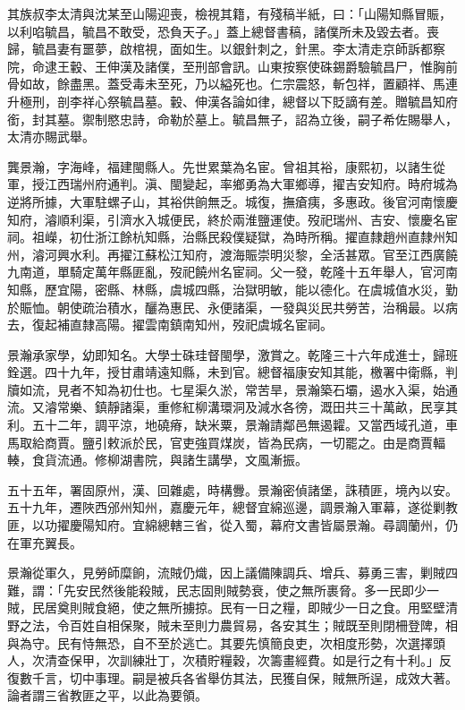 \begin{pinyinscope}
其族叔李太清與沈某至山陽迎喪，檢視其籍，有殘稿半紙，曰：「山陽知縣冒賑，以利啗毓昌，毓昌不敢受，恐負天子。」蓋上總督書稿，諸僕所未及毀去者。喪歸，毓昌妻有噩夢，啟棺視，面如生。以銀針刺之，針黑。李太清走京師訴都察院，命逮王轂、王伸漢及諸僕，至刑部會訊。山東按察使硃錫爵驗毓昌尸，惟胸前骨如故，餘盡黑。蓋受毒未至死，乃以縊死也。仁宗震怒，斬包祥，置顧祥、馬連升極刑，剖李祥心祭毓昌墓。轂、伸漢各論如律，總督以下貶謫有差。贈毓昌知府銜，封其墓。禦制愍忠詩，命勒於墓上。毓昌無子，詔為立後，嗣子希佐賜舉人，太清亦賜武舉。

龔景瀚，字海峰，福建閩縣人。先世累葉為名宦。曾祖其裕，康熙初，以諸生從軍，授江西瑞州府通判。滇、閩變起，率鄉勇為大軍鄉導，擢吉安知府。時府城為逆將所據，大軍駐螺子山，其裕供餉無乏。城復，撫瘡痍，多惠政。後官河南懷慶知府，濬順利渠，引濟水入城便民，終於兩淮鹽運使。歿祀瑞州、吉安、懷慶名宦祠。祖嶸，初仕浙江餘杭知縣，治縣民殺僕疑獄，為時所稱。擢直隸趙州直隸州知州，濬河興水利。再擢江蘇松江知府，渡海賑崇明災黎，全活甚眾。官至江西廣饒九南道，單騎定萬年縣匪亂，歿祀饒州名宦祠。父一發，乾隆十五年舉人，官河南知縣，歷宜陽，密縣、林縣，虞城四縣，治獄明敏，能以德化。在虞城值水災，勤於賑恤。朝使疏治積水，釃為惠民、永便諸渠，一發與災民共勞苦，治稱最。以病去，復起補直隸高陽。擢雲南鎮南知州，歿祀虞城名宦祠。

景瀚承家學，幼即知名。大學士硃珪督閩學，激賞之。乾隆三十六年成進士，歸班銓選。四十九年，授甘肅靖遠知縣，未到官。總督福康安知其能，檄署中衛縣，判牘如流，見者不知為初仕也。七星渠久淤，常苦旱，景瀚築石壩，遏水入渠，始通流。又濬常樂、鎮靜諸渠，重修紅柳溝環洞及減水各徬，溉田共三十萬畝，民享其利。五十二年，調平涼，地磽瘠，缺米粟，景瀚請鄰邑無遏糶。又當西域孔道，車馬取給商賈。鹽引敕派於民，官吏強買煤炭，皆為民病，一切罷之。由是商賈輻輳，食貨流通。修柳湖書院，與諸生講學，文風漸振。

五十五年，署固原州，漢、回雜處，時構釁。景瀚密偵諸堡，誅積匪，境內以安。五十九年，遷陜西邠州知州，嘉慶元年，總督宜綿巡邊，調景瀚入軍幕，遂從剿教匪，以功擢慶陽知府。宜綿總轄三省，從入蜀，幕府文書皆屬景瀚。尋調蘭州，仍在軍充翼長。

景瀚從軍久，見勞師糜餉，流賊仍熾，因上議備陳調兵、增兵、募勇三害，剿賊四難，謂：「先安民然後能殺賊，民志固則賊勢衰，使之無所裹脅。多一民即少一賊，民居奠則賊食絕，使之無所擄掠。民有一日之糧，即賊少一日之食。用堅壁清野之法，令百姓自相保聚，賊未至則力農貿易，各安其生；賊既至則閉柵登陴，相與為守。民有恃無恐，自不至於逃亡。其要先慎簡良吏，次相度形勢，次選擇頭人，次清查保甲，次訓練壯丁，次積貯糧穀，次籌畫經費。如是行之有十利。」反復數千言，切中事理。嗣是被兵各省舉仿其法，民獲自保，賊無所逞，成效大著。論者謂三省教匪之平，以此為要領。


\end{pinyinscope}
